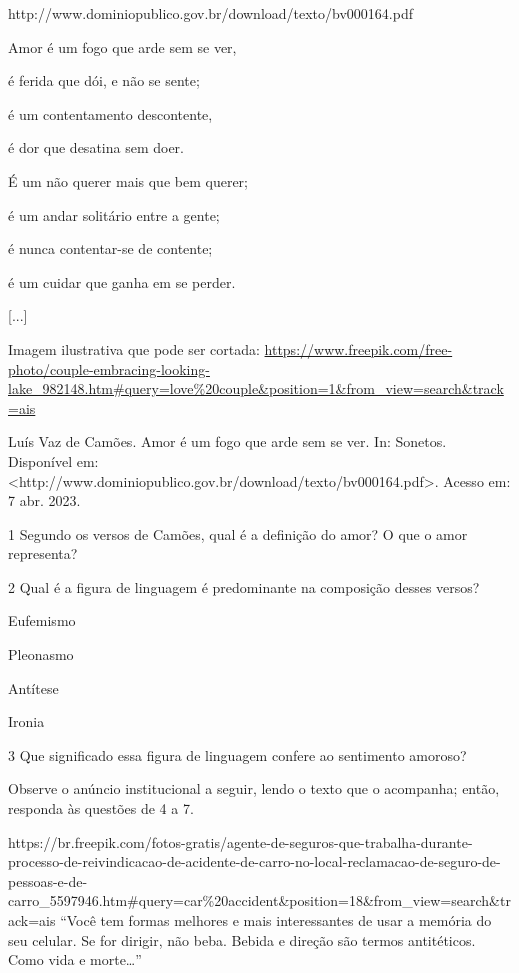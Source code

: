 \begin{itemize}
\begin{itemize}
http://www.dominiopublico.gov.br/download/texto/bv000164.pdf

Amor é um fogo que arde sem se ver,

é ferida que dói, e não se sente;

é um contentamento descontente,

é dor que desatina sem doer.

É um não querer mais que bem querer;

é um andar solitário entre a gente;

é nunca contentar-se de contente;

é um cuidar que ganha em se perder.

{[}...{]}

Imagem ilustrativa que pode ser cortada:
\url{https://www.freepik.com/free-photo/couple-embracing-looking-lake_982148.htm\#query=love\%20couple\&position=1\&from_view=search\&track=ais}

Luís Vaz de Camões. Amor é um fogo que arde sem se ver. In: Sonetos.
Disponível em:
\textless{}http://www.dominiopublico.gov.br/download/texto/bv000164.pdf\textgreater{}.
Acesso em: 7 abr. 2023.

\num{1} Segundo os versos de Camões, qual é a definição do amor? O que o
amor representa? 

\num{2} Qual é a figura de linguagem é predominante na composição desses
versos?

 Eufemismo

 Pleonasmo

 Antítese

 Ironia

\num{3} Que significado essa figura de linguagem confere ao sentimento
amoroso? 

Observe o anúncio institucional a seguir, lendo o texto que o acompanha;
então, responda às questões de 4 a 7.

https://br.freepik.com/fotos-gratis/agente-de-seguros-que-trabalha-durante-processo-de-reivindicacao-de-acidente-de-carro-no-local-reclamacao-de-seguro-de-pessoas-e-de-carro\_5597946.htm\#query=car\%20accident\&position=18\&from\_view=search\&track=ais
``Você tem formas melhores e mais interessantes de usar a memória do seu
celular. Se for dirigir, não beba. Bebida e direção são termos
antitéticos. Como vida e morte\ldots{}''


\end{itemize}
\end{itemize}
